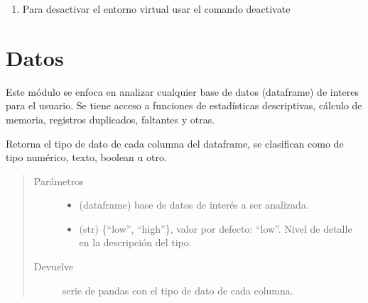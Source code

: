 \documentclass[letterpaper,10pt,openany,spanish]{sphinxmanual}
\begin{document}
\begin{enumerate}
\item {} 
Para desactivar el entorno virtual usar el comando deactivate
\begin{quote}

\begin{sphinxVerbatim}[commandchars=\\\{\}]
\end{sphinxVerbatim}
\end{quote}

\end{enumerate}


\chapter{Datos}
\label{\detokenize{datos:datos}}\label{\detokenize{datos:id1}}\label{\detokenize{datos::doc}}
Este módulo se enfoca en analizar cualquier base de datos (dataframe) de interes para el usuario. Se tiene acceso a funciones de estadísticas descriptivas, cálculo de memoria, registros duplicados, faltantes y otras.

\label{\detokenize{datos:module-datos}}

\begin{fulllineitems}
\label{\detokenize{datos:datos.col_type}}
Retorna el tipo de dato de cada columna del dataframe, se clasifican como de tipo numérico, texto, boolean u otro.
\begin{quote}\begin{description}
\item[{Parámetros}] \leavevmode\begin{itemize}
\item {} 
 \textendash{} (dataframe) base de datos de interés a ser analizada.

\item {} 
 \textendash{} (str) \{“low”, “high”\}, valor por defecto: “low”. Nivel de detalle en la descripción del tipo.

\end{itemize}

\item[{Devuelve}] \leavevmode
serie de pandas con el tipo de dato de cada columna.

\end{description}\end{quote}

\end{fulllineitems}
\end{document}
